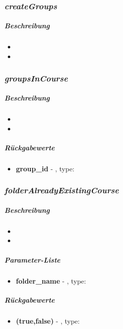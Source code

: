 \subsubsection*{\textit{createGroups}}\label{createGroupsGGUI}
\subparagraph{Beschreibung}
\begin{itemize}
	\item[] \noindent{}
	\item[] 
\end{itemize}

\subsubsection*{\textit{groupsInCourse}}\label{groupsInCourseGGUI}
\subparagraph{Beschreibung}
\begin{itemize}
	\item[] \noindent{}
	\item[] 
\end{itemize}
\subparagraph{Rückgabewerte}
\begin{itemize}
	\item[] \textbf{group\_id} - , type: 
\end{itemize}

\subsubsection*{\textit{folderAlreadyExistingCourse}}\label{folderAlreadyExistingCourseGGUI}
\subparagraph{Beschreibung}
\begin{itemize}
	\item[] \noindent{}
	\item[] 
\end{itemize}
\subparagraph{Parameter-Liste}
\begin{itemize}
	\item[] \textbf{folder\_name} - , type: 
\end{itemize}
\subparagraph{Rückgabewerte}
\begin{itemize}
	\item[] \textbf{(true,false)} - , type: 
\end{itemize}

